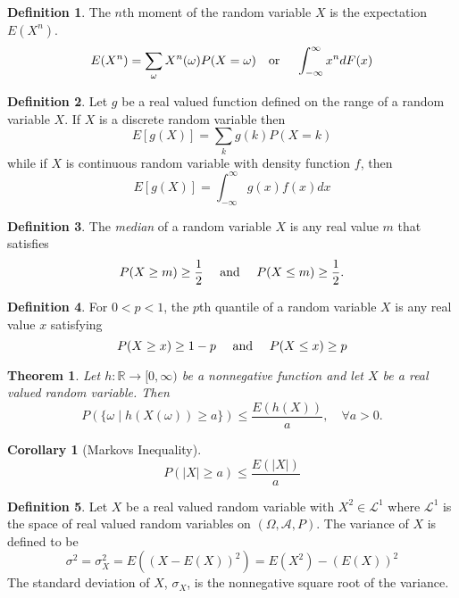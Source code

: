 \documentclass{article}
\newtheorem{theorem}{Theorem}[section]
\newtheorem{corollary}{Corollary}[section]
\theoremstyle{definition}
\newtheorem{definition}{Definition}[section]
\theoremstyle{remark}
\begin{document}
\begin{definition}
The $n$th moment of the random variable $X$ is the expectation $E(X^n)$. 
\[
E(X^n) = \sum_{\omega}{X^n(\omega)P(X = \omega)} \quad \textnormal{or } \quad \int_{-\infty}^{\infty}x^ndF(x)
\]
\end{definition}

\begin{definition}
Let $g$ be a real valued function defined on the range
of a random variable $X$. If $X$ is a discrete random variable then 
\[
E[g(X)] = \sum_k{g(k)P(X=k)}
\]
while if $X$ is continuous random variable with density function $f$, then
\[
E[g(X)] = \int_{-\infty}^{\infty}{g(x)f(x)dx}
\]
\end{definition}

\begin{definition}
The \textit{median} of a random variable $X$ is any real value $m$
that satisfies \[
P(X \geq m) \geq \frac{1}{2} \quad \textnormal{ and } \quad 
P(X \leq m) \geq \frac{1}{2}.
\]
\end{definition}

\begin{definition}
For $0 < p < 1$, the $p$th quantile of a random variable $X$ 
is any real value $x$ satisfying 
\[
P(X \geq x) \geq 1-p \quad \textnormal{ and } \quad P(X \leq x) \geq p
\]
\end{definition}

\begin{theorem}
Let $h: \mathbb{R} \to [0,\infty)$ be a nonnegative function and let $X$ be a real valued random variable. Then 
\[
P(\{\omega \mid h(X(\omega)) \geq a\}) \leq \frac{E(h(X))}{a}, \quad \forall a > 0.
\]
\end{theorem}



\begin{corollary}[Markovs Inequality] \label{Markovs Inequality}
\[
P({|X| \geq a}) \leq \frac{E(|X|)}{a}
\]

\end{corollary}



\begin{definition}\label{def: Variance and Standard Deviation}
Let $X$ be a real valued random variable with $X^2 \in \mathcal{L}^1$ where $\mathcal{L}^1$ is the space of real valued random variables on $(\Omega, \mathcal{A}, P)$. The variance of $X$ is defined to be
\[
\sigma^2 = \sigma^2_X = E((X - E(X))^2) = E(X^2) - (E(X))^2
\]
The standard deviation of $X$, $\sigma_X$, is the nonnegative square root of the variance. 

\end{definition}
\end{document}
